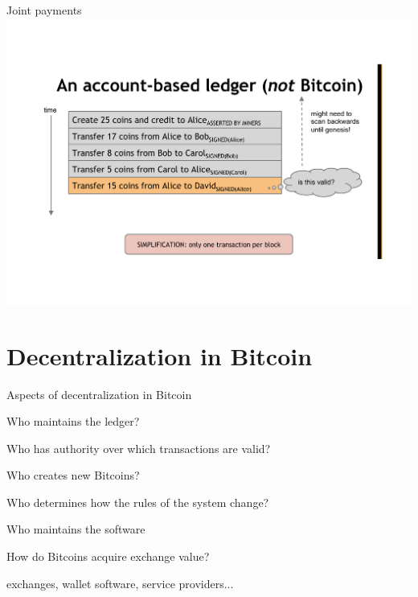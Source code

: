 \begin{frame}{Joint payments}
\includegraphics[width=\textwidth,page=4]{ledger}
\end{frame}


\section{Decentralization in Bitcoin}

\begin{frame}{Aspects of decentralization in Bitcoin}

\BI
\item Who maintains the ledger?
\item Who has authority over which transactions are valid?
\item Who creates new Bitcoins?
\EI

\BI
\item Who determines how the rules of the system change?
\item Who maintains the software
\item How do Bitcoins acquire exchange value?
\EI

\BI
\item exchanges, wallet software, service providers...
\EI

\end{frame}

